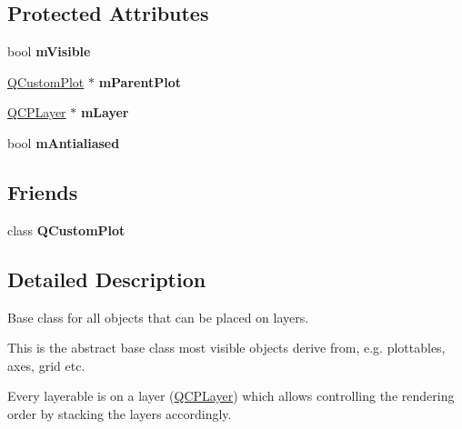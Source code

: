\subsection*{Protected Attributes}
\begin{DoxyCompactItemize}
\item 
\hypertarget{classQCPLayerable_a62e3aed8427d6ce3ccf716f285106cb3}{bool {\bfseries m\-Visible}}\label{classQCPLayerable_a62e3aed8427d6ce3ccf716f285106cb3}

\item 
\hypertarget{classQCPLayerable_aa2a528433e44db02b8aef23c1f9f90ed}{\hyperlink{classQCustomPlot}{Q\-Custom\-Plot} $\ast$ {\bfseries m\-Parent\-Plot}}\label{classQCPLayerable_aa2a528433e44db02b8aef23c1f9f90ed}

\item 
\hypertarget{classQCPLayerable_aa38ec5891aff0f50b36fd63e9372a0cd}{\hyperlink{classQCPLayer}{Q\-C\-P\-Layer} $\ast$ {\bfseries m\-Layer}}\label{classQCPLayerable_aa38ec5891aff0f50b36fd63e9372a0cd}

\item 
\hypertarget{classQCPLayerable_a3ab45a4c76a3333ce42eb217a81733ec}{bool {\bfseries m\-Antialiased}}\label{classQCPLayerable_a3ab45a4c76a3333ce42eb217a81733ec}

\end{DoxyCompactItemize}
\subsection*{Friends}
\begin{DoxyCompactItemize}
\item 
\hypertarget{classQCPLayerable_a1cdf9df76adcfae45261690aa0ca2198}{class {\bfseries Q\-Custom\-Plot}}\label{classQCPLayerable_a1cdf9df76adcfae45261690aa0ca2198}

\end{DoxyCompactItemize}


\subsection{Detailed Description}
Base class for all objects that can be placed on layers. 

This is the abstract base class most visible objects derive from, e.\-g. plottables, axes, grid etc.

Every layerable is on a layer (\hyperlink{classQCPLayer}{Q\-C\-P\-Layer}) which allows controlling the rendering order by stacking the layers accordingly.

